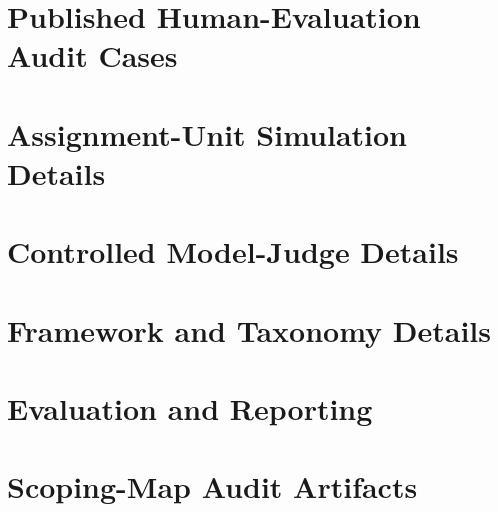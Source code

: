 \documentclass[11pt]{article}
\begin{document}
\FloatBarrier
\section{Published Human-Evaluation Audit Cases}


\FloatBarrier


\FloatBarrier
\section{Assignment-Unit Simulation Details}


\FloatBarrier
\section{Controlled Model-Judge Details}


\FloatBarrier
\section{Framework and Taxonomy Details}






\FloatBarrier
\section{Evaluation and Reporting}
\label{sec:appendix-eval}






\FloatBarrier
\section{Scoping-Map Audit Artifacts}
\label{sec:audit-artifacts}






\FloatBarrier
\end{document}
